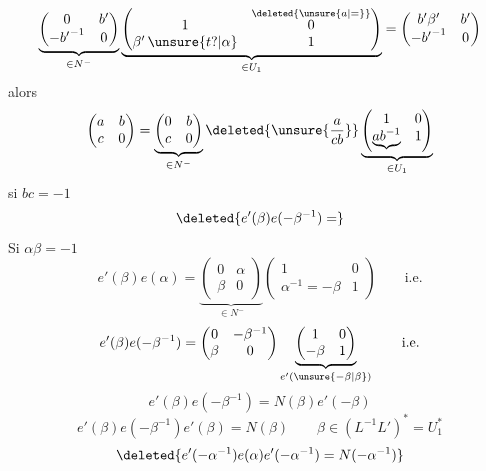 \[\underbrace{\begin{pmatrix}0&b'\\-{b'}^{-1}&0\end{pmatrix}}_{\in N^-}\underbrace{\begin{pmatrix}1&\overset{\deleted{\unsure{a|=}}}{0}\\\beta'\,\unsure{t?|\alpha}&1\end{pmatrix}}_{\in U_1}=\begin{pmatrix}b'\beta'&b'\\-{b'}^{-1}&0\end{pmatrix}\]
alors
\[\begin{pmatrix}a&b\\c&0\end{pmatrix}=\underbrace{\begin{pmatrix}0&b\\c&0\end{pmatrix}}_{\in N^-}\deleted{\unsure{\frac{a}{cb}}}\underbrace{\begin{pmatrix}1&0\\\underbrace{ab^{-1}}&1\end{pmatrix}}_{\in U_1}\]
si $bc=-1$
\[\deleted{e'(\beta)e(-\beta^{-1})=}\]
Si $\alpha\beta=-1$
\[e'(\beta)e(\alpha)=\underbrace{\begin{pmatrix}0&\alpha\\\beta&0\end{pmatrix}}_{\in N^-}\begin{pmatrix}1&0\\\alpha^{-1}=-\beta&1\end{pmatrix}\qquad\text{i.e.}\]
\[e'(\beta)e(-\beta^{-1})=\begin{pmatrix}0&-\beta^{-1}\\\beta&0\end{pmatrix}\underbrace{\begin{pmatrix}1&0\\-\beta&1\end{pmatrix}}_{e'(\unsure{-\beta|\beta})}\qquad\text{i.e.}\]
\[e'(\beta)e(-\beta^{-1})=N(\beta)e'(-\beta)\]
\[\boxed{\boxed{e'(\beta)e(-\beta^{-1})e'(\beta)=N(\beta)}}\qquad \beta\in(L^{-1}L')^*=U_1^{*}\]
\[\deleted{e'(-\alpha^{-1})e(\alpha)e'(-\alpha^{-1})=N(-\alpha^{-1})}\]
